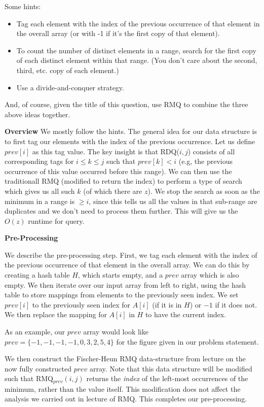 \documentclass[12pt]{exam}
\newcommand*{\bigo}[1]{O \left( #1 \right)}
\begin{document}
\begin{questions}
Some hints:
\begin{itemize}
    \item Tag each element with the index of the previous occurrence of that element in the overall array (or with -1 if it's the first copy of that element).
    \item To count the number of distinct elements in a range, search for the first copy of each distinct element within that range. (You don't care about the second, third, etc. copy of each element.)
    \item Use a divide-and-conquer strategy.
\end{itemize}
And, of course, given the title of this question, use RMQ to combine the three above ideas together.

\begin{solution}

\textbf{Overview}
We mostly follow the hints. The general idea for our data structure is to first tag our elements with the index of the previous occurrence. Let us define $prev[i]$ as this tag value. The key insight is that RDQ($i,j$) consists of all corresponding tags for $i \leq k \leq j$ such that $prev[k] < i$ (e.g, the previous occurrence of this value occurred before this range). We can then use the traditionall RMQ (modified to return the index) to perform a type of search which gives us all such $k$ (of which there are $z$). We stop the search as soon as the minimum in a range is $\geq i$, since this tells us all the values in that sub-range are duplicates and we don't need to process them further. This will give us the $\bigo{z}$ runtime for query.

\textbf{Pre-Processing}

We describe the pre-processing step. First, we tag each element with the index of the previous occurrence of that element in the overall array. We can do this by creating a hash table $H$, which starts empty, and a $prev$ array which is also empty. We then iterate over our input array from left to right, using the hash table to store mappings from elements to the previously seen index. We set $prev[i]$ to the previously seen index for $A[i]$ (if it is in $H$) or $-1$ if it does not. We then replace the mapping for $A[i]$ in $H$ to have the current index.

As an example, our $prev$ array would look like $prev = \{ -1, -1, -1, -1, 0, 3, 2, 5, 4 \}$ for the figure given in our problem statement.


We then construct the Fischer-Heun RMQ data-structure from lecture on the now fully constructed $prev$ array. Note that this data structure will be modified such that RMQ$_{prev}(i,j)$ returns the \textit{index} of the left-most occurrences of the minimum, rather than the value itself. This modification does not affect the analysis we carried out in lecture of RMQ. This completes our pre-processing.



\end{solution}
\end{questions}
\end{document}
